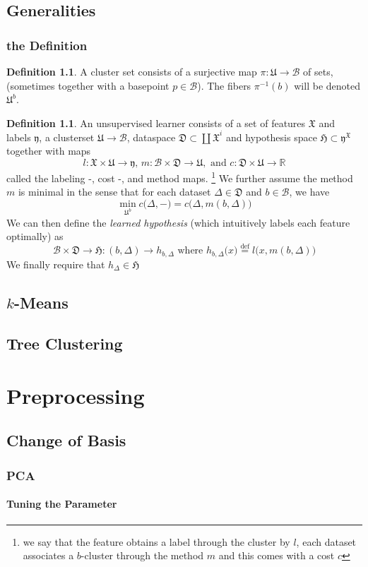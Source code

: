 \documentclass{book}
\theoremstyle{plain}
\theoremstyle{definition}
\newtheorem{definition}[corollary]{Definition}
\renewcommand{\d}[1]{\mathbb{#1}}
\newcommand{\define}{\stackrel{\operatorname{def}}{=}}
\newcommand{\f}[1]{\mathfrak{#1}}
\newcommand{\mor}{\longrightarrow}
\renewcommand{\r}[1]{\mathcal{#1}}
\renewcommand{\r}[1]{\mathcal{#1}}
\begin{document}
\chapter{Generalities}


\section{the Definition}

\begin{definition}
A cluster set consists of a surjective map $\pi:\f{U}\mor \r{B}$ of sets, (sometimes together with a basepoint $p\in \r{B}$). The fibers $\pi^{-1}(b)$ will be denoted $\f{U}^b$.
\end{definition}

\begin{definition}
An unsupervised learner consists of a set of features $\f{X}$ and labels $\f{y}$, a clusterset $\f{U}\mor \r{B}$, dataspace $\f{D}\subset \coprod \f{X}^i$ and hypothesis space $\f{H}\subset \f{y}^\f{X}$ together with maps
\[
l:\f{X}\times \f{U}\mor \f{y},\,  m:\r{B}\times \f{D}\mor \f{U}, \textrm{ and } c:\f{D}\times \f{U}\mor \d{R}
\] 
called the labeling -, cost -, and method maps. 
\footnote{\noindent we say that the feature obtains a label through the cluster by $l$, each dataset associates a $b$-cluster through the method $m$ and this comes with a cost $c$} 
We further assume the method $m$ is minimal in the sense that for each dataset $\Delta \in \f{D}$ and $b \in \r{B}$, we have
\[
\min_{\f{U}^b} c\big(\Delta, -\big)=c\big(\Delta,m(b, \Delta)\big)
\]
We can then define the \emph{learned hypothesis} (which intuitively labels each feature optimally) as
\[
\r{B}\times \f{D}\mor \f{H}: (b,\Delta)\mor h_{b,\Delta}
\textrm{ where } h_{b,\Delta}\big(x\big)\define l\big(x,m(b,\Delta)\big)
\]
We finally require that $h_\Delta \in \f{H}$
\end{definition}

\chapter{$k$-Means}

\chapter{Tree Clustering}

\part{Preprocessing}

\chapter{Change of Basis }

\section{PCA}

\subsection{Tuning the Parameter}





\end{document}
